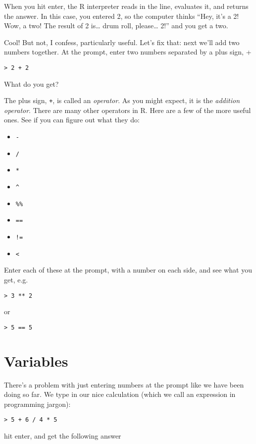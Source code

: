 \documentclass[
]{book}
\providecommand{\tightlist}{%
  \setlength{\itemsep}{0pt}\setlength{\parskip}{0pt}}
\begin{document}
When you hit enter, the R interpreter reads in the line, evaluates it, and returns the answer. In this case, you entered 2, so the computer thinks ``Hey, it's a 2! Wow, a two! The result of 2 is\ldots{} drum roll, please\ldots{} 2!'' and you get a two.

Cool! But not, I confess, particularly useful. Let's fix that: next we'll add two numbers together. At the prompt, enter two numbers separated by a plus sign, +

\texttt{\textgreater{}\ 2\ +\ 2}

What do you get?

The plus sign, \texttt{+}, is called an \emph{operator}. As you might expect, it is the \emph{addition operator}. There are many other operators in R. Here are a few of the more useful ones. See if you can figure out what they do:

\begin{itemize}
\tightlist
\item
  \texttt{-}
\item
  \texttt{/}
\item
  \texttt{*}
\item
  \texttt{\^{}}
\item
  \texttt{\%\%}
\item
  \texttt{==}
\item
  \texttt{!=}
\item
  \texttt{\textless{}}
\end{itemize}

Enter each of these at the prompt, with a number on each side, and see what you get, e.g.

\texttt{\textgreater{}\ 3\ **\ 2}

or

\texttt{\textgreater{}\ 5\ ==\ 5}

\hypertarget{r-basics-variables}{%
\section{Variables}\label{r-basics-variables}}

There's a problem with just entering numbers at the prompt like we have been doing so far. We type in our nice calculation (which we call an expression in programming jargon):

\begin{verbatim}
> 5 + 6 / 4 * 5
\end{verbatim}

hit enter, and get the following answer
\end{document}

